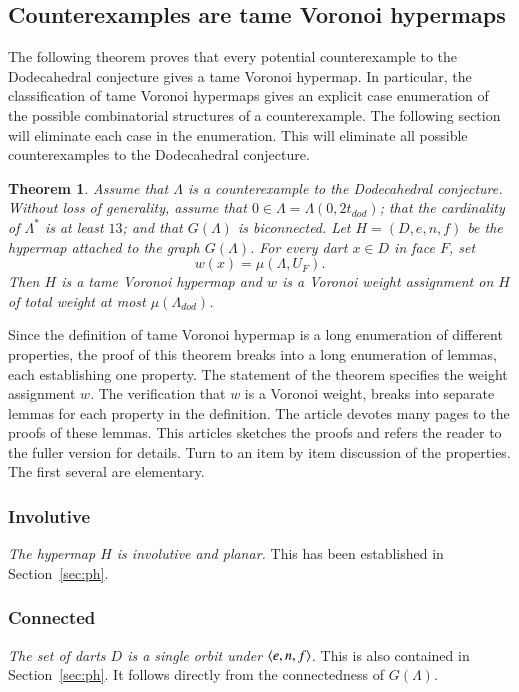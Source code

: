 \documentclass{article} %
\newtheorem{theorem}{Theorem}[section]
\begin{document}
\subsection{Counterexamples are tame Voronoi hypermaps}

The following theorem proves that every potential counterexample to the Dodecahedral
conjecture gives a tame Voronoi hypermap.  In particular, the classification
of tame Voronoi hypermaps gives an explicit case enumeration of the possible combinatorial structures of a counterexample.  The following section will eliminate each case in the enumeration.
This will eliminate all possible counterexamples to the Dodecahedral conjecture.

\begin{theorem}  Assume that $\Lambda$ is a counterexample to the Dodecahedral
conjecture.  Without loss of generality,  assume that $0\in\Lambda=\Lambda(0,2t_{dod})$;
that the cardinality of $\Lambda^*$ is at least $13$; and that $G(\Lambda)$ is biconnected.  Let $H=(D,e,n,f)$ be the hypermap attached to the graph $G(\Lambda)$.
 For every dart $x\in D$ in face $F$, set
$$w(x) = \mu(\Lambda,U_F).$$
Then $H$ is a tame Voronoi hypermap and $w$ is a Voronoi weight assignment on $H$ of total weight at most $\mu(\Lambda_{dod})$.
\end{theorem}

Since the definition of tame Voronoi hypermap is a long enumeration of
different properties, the proof of this theorem breaks into a long
enumeration of lemmas, each establishing one property. The statement
of the theorem specifies the weight assignment $w$. The verification
that $w$ is a Voronoi weight, breaks into separate lemmas for each
property in the definition. The article \cite{Hales:2002:Dodec}
devotes many pages to the proofs of these lemmas. This articles
sketches the proofs and refers the reader to the fuller version for
details. Turn to an item by item discussion of the properties. The
first several are elementary.

\subsubsection{Involutive}
{\it The hypermap $H$ is involutive and planar.}  This has been established in Section~\ref{sec:ph}.


\subsubsection{Connected}
{\it The set of darts $D$  is a single orbit under $\langle e,n,f\rangle$.}  This is also
contained in Section~\ref{sec:ph}. It follows directly from the
connectedness of $G(\Lambda)$.
\end{document}
